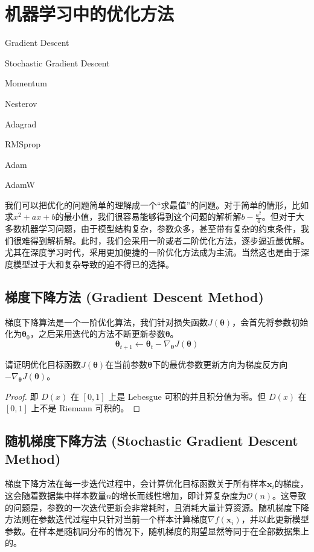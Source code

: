 \chapter{机器学习中的优化方法}

\begin{introduction}
  \item Gradient Descent
  \item Stochastic Gradient Descent
  \item Momentum
  \item Nesterov
  \item Adagrad
  \item RMSprop
  \item Adam
  \item AdamW
  \end{introduction}

我们可以把优化的问题简单的理解成一个“求最值”的问题。对于简单的情形，比如求$x^2+ax+b$的最小值，我们很容易能够得到这个问题的解析解$b-\frac{a^2}{4}$。但对于大多数机器学习问题，由于模型结构复杂，参数众多，甚至带有复杂的约束条件，我们很难得到解析解。此时，我们会采用一阶或者二阶优化方法，逐步逼近最优解。尤其在深度学习时代，采用更加便捷的一阶优化方法成为主流。当然这也是由于深度模型过于大和复杂导致的迫不得已的选择。

\section{梯度下降方法 (Gradient Descent Method)}

梯度下降算法是一个一阶优化算法，我们针对损失函数$J(\bm\theta)$，会首先将参数初始化为$\bm\theta_{0}$，之后采用迭代的方法不断更新参数$\bm\theta$。
\begin{equation}
  \label{grad_descent}
  \bm\theta_{t+1} \leftarrow \bm\theta_{t} - \nabla_{\bm\theta}J(\bm\theta)
\end{equation}

\begin{exercise}\label{exer:sgd}
  请证明优化目标函数$J(\bm{\theta})$在当前参数$\bm{\theta}$下的最优参数更新方向为梯度反方向$-\nabla_{\bm\theta}J(\bm\theta)$。  
\end{exercise}
 
\begin{proof}
  即 $D(x)$ 在 $[0,1]$ 上是 Lebesgue 可积的并且积分值为零。但 $D(x)$ 在 $[0,1]$ 上不是 Riemann 可积的。
\end{proof}

\section{随机梯度下降方法 (Stochastic Gradient Descent Method)}
梯度下降方法在每一步迭代过程中，会计算优化目标函数关于所有样本${\bm{x}_{i}}$的梯度，这会随着数据集中样本数量$n$的增长而线性增加，即计算复杂度为$\mathcal{O}(n)$。这导致的问题是，参数的一次迭代更新会非常耗时，且消耗大量计算资源。随机梯度下降方法则在参数迭代过程中只针对当前一个样本计算梯度$\nabla f(\bm{x}_i)$，并以此更新模型参数。在样本是随机同分布的情况下，随机梯度的期望显然等同于在全部数据集上的。

